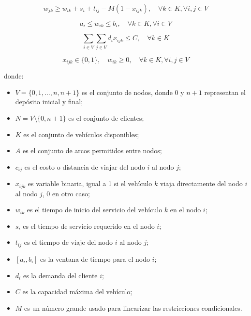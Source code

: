 \documentclass[12pt,titlepage,twoside,openright]{book}
\begin{document}
\begin{equation}
	w_{jk} \geq w_{ik} + s_i + t_{ij} - M (1 - x_{ijk}), \quad \forall k \in K, \forall i,j \in V
	\label{eq:VRPTW_time_window}
\end{equation}

\begin{equation}
	a_i \leq w_{ik} \leq b_i, \quad \forall k \in K, \forall i \in V
	\label{eq:VRPTW_time_bounds}
\end{equation}

\begin{equation}
	\sum_{i \in V} \sum_{j \in V} d_i x_{ijk} \leq C, \quad \forall k \in K
	\label{eq:VRPTW_capacity}
\end{equation}

\begin{equation}
	x_{ijk} \in \{0,1\}, \quad w_{ik} \geq 0, \quad \forall k \in K, \forall i,j \in V
	\label{eq:VRPTW_domains}
\end{equation}

\medskip
\noindent donde:
\begin{itemize}
	\item \(V = \{0, 1, \ldots, n, n+1\}\) es el conjunto de nodos, donde \(0\) y \(n+1\) representan el depósito inicial y final;
	\item \(N = V \setminus \{0, n+1\}\) es el conjunto de clientes;
	\item \(K\) es el conjunto de vehículos disponibles;
	\item \(A\) es el conjunto de arcos permitidos entre nodos;
	\item \(c_{ij}\) es el costo o distancia de viajar del nodo \(i\) al nodo \(j\);
	\item \(x_{ijk}\) es variable binaria, igual a 1 si el vehículo \(k\) viaja directamente del nodo \(i\) al nodo \(j\), 0 en otro caso;
	\item \(w_{ik}\) es el tiempo de inicio del servicio del vehículo \(k\) en el nodo \(i\);
	\item \(s_i\) es el tiempo de servicio requerido en el nodo \(i\);
	\item \(t_{ij}\) es el tiempo de viaje del nodo \(i\) al nodo \(j\);
	\item \([a_i, b_i]\) es la ventana de tiempo para el nodo \(i\);
	\item \(d_i\) es la demanda del cliente \(i\);
	\item \(C\) es la capacidad máxima del vehículo;
	\item \(M\) es un número grande usado para linearizar las restricciones condicionales.
\end{itemize}
\end{document}
